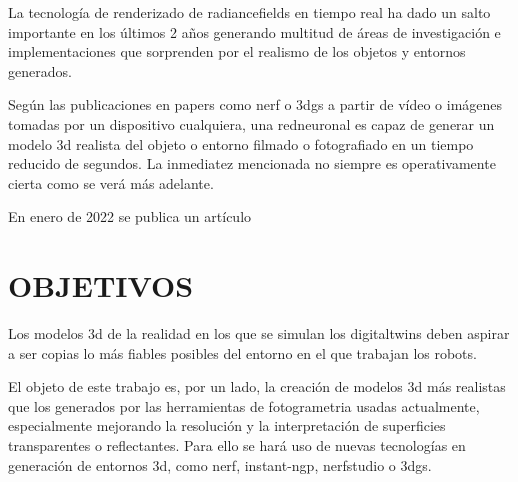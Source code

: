 \documentclass[a4paper, 12pt, spanish, twoside]{article}
\begin{document}
La tecnología de \gls{renderizado} de \glspl{radiancefield} en tiempo real ha dado un salto importante en los últimos 2 años generando multitud de áreas de investigación e implementaciones que sorprenden por el realismo de los objetos y entornos generados.

Según las publicaciones en papers como \acrfull{nerf} o \acrfull{3dgs} a partir de vídeo o imágenes tomadas por un dispositivo cualquiera, una \gls{redneuronal} es capaz de generar un modelo \acrshort{3d} realista del objeto o entorno filmado o fotografiado en un tiempo reducido de segundos. La inmediatez mencionada no siempre es operativamente cierta como se verá más adelante.



En enero de 2022 se publica un artículo







\clearpage





\newpage
\section{OBJETIVOS} \label{sec:objetivos}

Los modelos \acrshort{3d} de la realidad en los que se simulan los \glspl{digitaltwin} deben aspirar a ser copias lo más fiables posibles del entorno en el que trabajan los robots.  

El objeto de este trabajo es, por un lado, la creación de modelos \acrshort{3d} más realistas que los generados por las herramientas de \gls{fotogrametria} usadas actualmente, especialmente mejorando la resolución y la interpretación de superficies transparentes o reflectantes. Para ello se hará uso de nuevas tecnologías en generación de entornos \acrshort{3d}, como \acrfull{nerf}, \gls{instant-ngp}, \gls{nerfstudio} o \acrfull{3dgs}. 
\end{document}
